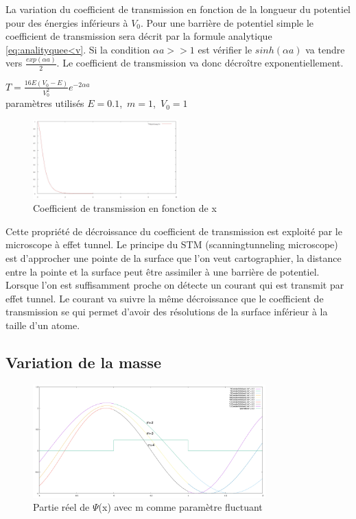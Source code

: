 La variation du coefficient de transmission en fonction de la longueur du potentiel pour des énergies inférieurs à $V_{0}$. Pour une barrière de potentiel simple le coefficient de transmission sera décrit par la formule analytique \ref{eq:analityquee<v}. Si la condition $\alpha a >>1$ est vérifier le $sinh(\alpha a)$ va tendre vers $\frac{exp(\alpha a)}{2}$. Le coefficient de transmission va donc décroître exponentiellement.

\begin{center}
$T=\frac{16E(V_{0}-E)}{V_{0}^{2}}e^{-2\alpha a}$\\
paramètres utilisés $E=0.1$,\ $m=1$,\ $V_{0}=1$
\end{center}
\begin{figure}[!ht]
    \center
    \includegraphics[width=0.5\textwidth]{t=f(a).jpg}
    \caption{Coefficient de transmission en fonction de x }
    \label{t=f(a)}
\end{figure}

Cette propriété de décroissance du coefficient de transmission est exploité par le microscope à effet tunnel. Le principe du STM  (scanningtunneling microscope) est d'approcher une pointe de la surface que l'on veut cartographier, la distance entre la pointe et la surface peut être assimiler à une barrière de potentiel. Lorsque l'on est suffisamment  proche on détecte un courant qui est transmit par effet tunnel. Le courant va suivre la même décroissance que le coefficient de transmission se qui permet d'avoir des résolutions de la surface inférieur à la taille d'un atome.



\subsection{Variation de la masse}

\begin{figure}[!ht]
    \centering
    \includegraphics[width=0.8\textwidth]{potentiel 1 barrier/m augmentant seul2-1.png}
    \caption{Partie réel de $\Psi$(x) avec m comme paramètre fluctuant}
    \label{fig:my_label}
\end{figure}

